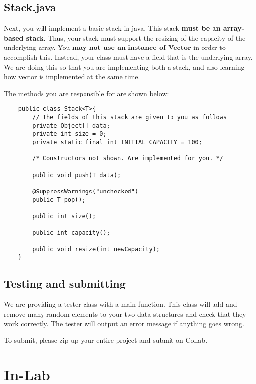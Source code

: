 \documentclass[paper=a4, fontsize=11pt, parskip=full]{scrartcl} %
\numberwithin{equation}{section} %
\numberwithin{figure}{section} %
\numberwithin{table}{section} %
\begin{document}
\subsection{Stack.java}

Next, you will implement a basic stack in java. This stack \textbf{must be an array-based stack}. Thus, your stack must support the resizing of the capacity of the underlying array. You \textbf{may not use an instance of Vector} in order to accomplish this. Instead, your class must have a field that is the underlying array. We are doing this so that you are implementing both a stack, and also learning how vector is implemented at the same time.

The methods you are responsible for are shown below:

\begin{lstlisting}
	public class Stack<T>{
		// The fields of this stack are given to you as follows
		private Object[] data;
		private int size = 0;
		private static final int INITIAL_CAPACITY = 100;

		/* Constructors not shown. Are implemented for you. */

		public void push(T data);

		@SuppressWarnings("unchecked")
		public T pop();

		public int size();

		public int capacity();

		public void resize(int newCapacity);
	}
\end{lstlisting}

\subsection{Testing and submitting}

We are providing a tester class with a main function. This class will add and remove many random elements to your two data structures and check that they work correctly. The tester will output an error message if anything goes wrong.

To submit, please zip up your entire project and submit on Collab.



\newpage
\section{In-Lab}
\end{document}
